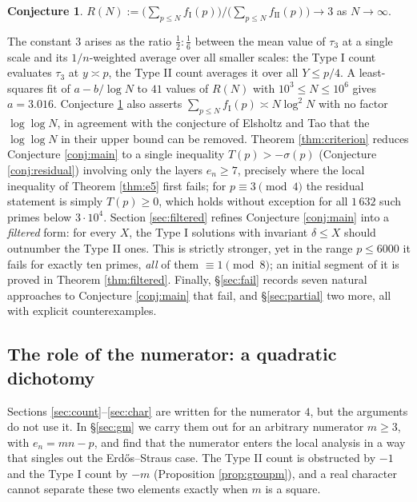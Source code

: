 \documentclass[11pt,reqno]{amsart}
\theoremstyle{plain}
\theoremstyle{definition}
\newtheorem{conjecture}[theorem]{Conjecture}
\numberwithin{equation}{section}
\newcommand{\fI}{f_{\mathrm{I}}}
\newcommand{\fII}{f_{\mathrm{II}}}
\begin{document}
\begin{conjecture}\label{conj:ratio-intro}
$\displaystyle R(N):=\Big(\sum_{p\le N}\fI(p)\Big)\Big/\Big(\sum_{p\le N}\fII(p)\Big)
\longrightarrow3$ as $N\to\infty$.
\end{conjecture}

\noindent
The constant $3$ arises as the ratio $\tfrac12:\tfrac16$ between the mean value of
$\tau_{3}$ at a single scale and its $1/n$-weighted average over all smaller scales:
the Type I count evaluates $\tau_{3}$ at $y\asymp p$, the Type II count averages it
over all $Y\le p/4$. A least-squares fit of $a-b/\log N$ to $41$ values of $R(N)$
with $10^{3}\le N\le10^{6}$ gives $a=3.016$. Conjecture \ref{conj:ratio-intro} also
asserts $\sum_{p\le N}\fI(p)\asymp N\log^{2}N$ with no factor $\log\log N$, in
agreement with the conjecture of Elsholtz and Tao \cite{ElsholtzTao} that the
$\log\log N$ in their upper bound can be removed. Theorem \ref{thm:criterion} reduces Conjecture \ref{conj:main} to a single
inequality $T(p)>-\sigma(p)$ (Conjecture \ref{conj:residual}) involving only the
layers $e_{n}\ge7$, precisely where the local inequality of Theorem \ref{thm:e5}
first fails; for $p\equiv3\pmod4$ the residual statement is simply $T(p)\ge0$, which
holds without exception for all $1\,632$ such primes below $3\cdot10^{4}$.
Section \ref{sec:filtered} refines Conjecture \ref{conj:main} into a
\emph{filtered} form: for every $X$, the Type I solutions with invariant $\delta\le X$
should outnumber the Type II ones. This is strictly stronger, yet in the range
$p\le6000$ it fails for exactly ten primes, \emph{all} of them $\equiv1\pmod8$; an
initial segment of it is proved in Theorem \ref{thm:filtered}. Finally,
\S\ref{sec:fail} records seven natural approaches to Conjecture \ref{conj:main} that
fail, and \S\ref{sec:partial} two more, all with explicit counterexamples.

\subsection{The role of the numerator: a quadratic dichotomy}\label{sec:introdich}
Sections \ref{sec:count}--\ref{sec:char} are written for the numerator $4$, but the
arguments do not use it. In \S\ref{sec:gm} we carry them out for an arbitrary
numerator $m\ge3$, with $e_{n}=mn-p$, and find that the numerator enters the local
analysis in a way that singles out the Erd\H{o}s--Straus case. The Type II count is
obstructed by $-1$ and the Type I count by $-m$ (Proposition \ref{prop:groupm}), and a
real character cannot separate these two elements exactly when $m$ is a square.
\end{document}
